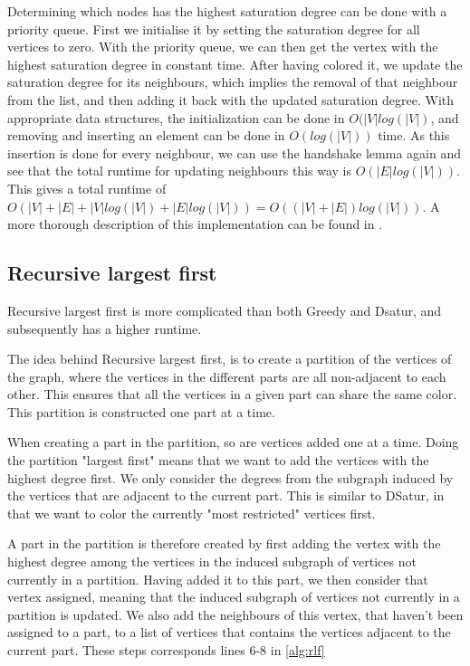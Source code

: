 \documentclass[a4paper]{article}
\begin{document}
Determining which nodes has the highest saturation degree can be done with a
priority queue.  First we initialise it by setting the saturation degree for all
vertices to zero. With the priority queue, we can then get the vertex with the
highest saturation degree in constant time. After having colored it, we update
the saturation degree for its neighbours, which implies the removal of that
neighbour from the list, and then adding it back with the updated saturation
degree. With appropriate data structures, the initialization can be done in
$O(|V|log(|V|)$, and removing and inserting an element can be done in $O(log(|V|))$
time. As this insertion is done for every neighbour, we can use the handshake
lemma again and see that the total runtime for updating neighbours this way is
$O(|E|log(|V|))$. This gives a total runtime of $O(|V|+|E|+|V|log(|V|)+|E|log(|V|))
= O( (|V|+|E|)log(|V|))$. A more thorough description of this implementation can
be found in \cite{Constructive}.

\subsection{Recursive largest first}

Recursive largest first is more complicated than both Greedy and Dsatur, 
and subsequently has a higher runtime.

The idea behind Recursive largest first, is to create a partition of the
vertices of the graph, where the vertices in the different parts are all
non-adjacent to each other. This ensures that all the vertices in a given part
can share the same color.  This partition is constructed one part at a time. 


When creating a part in the partition, so are vertices added one at a time. Doing the
partition "largest first" means that we want to add the vertices with the
highest degree first. We only consider the degrees from the subgraph induced by
the vertices that are adjacent to the current part. This is similar to DSatur,
in that we want to color the currently "most restricted" vertices first.

A part in the partition is therefore created by first adding the vertex with
the highest degree among the vertices in the induced subgraph of vertices not
currently in a partition. Having added it to this part, we then consider that
vertex assigned, meaning that the induced subgraph of vertices not currently in
a partition is updated.  We also add the neighbours of this vertex, that
haven't been assigned to a part, to a list of vertices that contains the
vertices adjacent to the current part.  
These steps corresponds lines 6-8 in \autoref{alg:rlf}
\end{document}

